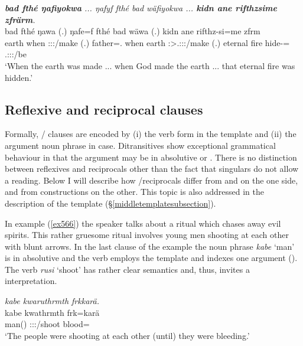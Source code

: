 \begin{exe}
	\ex \emph{\textbf{bad fthé ŋafiyokwa} ... ŋafyf fthé bad wäfiyokwa ... \textbf{kidn ane rifthzsime zfrärm}.}\\
	\gll bad fthé ŋawa (.) ŋafe=f fthé bad wäwa (.) kidn ane rifthz-si=me zfrm\\
	earth when \Sg:\Sbj:\Pst:\Ipfv/make (.) father=\Erg.{\Sg} when earth \Stsg:\Sbj>\Tsg.\F:\Obj:\Pst:\Ipfv/make (.) {eternal fire} {\Dem} hide-\Nmlz={\Ins} \Tsg.\F:\Sbj:\Pst:\Dur/be\\
	\trans `When the earth was made ... when God made the earth ... that eternal fire was hidden.'
	\label{ex554}
\end{exe}

\subsection{Reflexive and reciprocal clauses}\label{reflrecipclause}

Formally, / clauses are encoded by (i) the verb form in the  template and (ii) the argument noun phrase in  case. Ditransitives show exceptional grammatical behaviour in that the argument may be in absolutive or  . There is no distinction between reflexives and reciprocals other than the fact that singulars do not allow a  reading. Below I will describe how /reciprocals differ from  and   on the one side, and from  constructions on the other. This topic is also addressed in the description of the  template ({\S}\ref{middletemplatesubsection}).

In example (\ref{ex566}) the speaker talks about a ritual which chases away evil spirits. This rather gruesome ritual involves young men shooting at each other with blunt arrows. In the last clause of the example the noun phrase \emph{kabe} `man' is in absolutive  and the verb employs the  template and indexes one argument (\Stpl). The verb \emph{rusi} `shoot' has rather clear  semantics and, thus, invites a  interpretation.

\begin{exe}
	\ex \emph{kabe kwaruthrmth frkkarä.}\\
	\gll kabe kwathrmth frk=karä\\
	man(\Abs) \Stpl:\Sbj:\Pst:\Dur/shoot blood=\Prop\\
	\trans `The people were shooting at each other (until) they were bleeding.'
	\label{ex566}
\end{exe}

